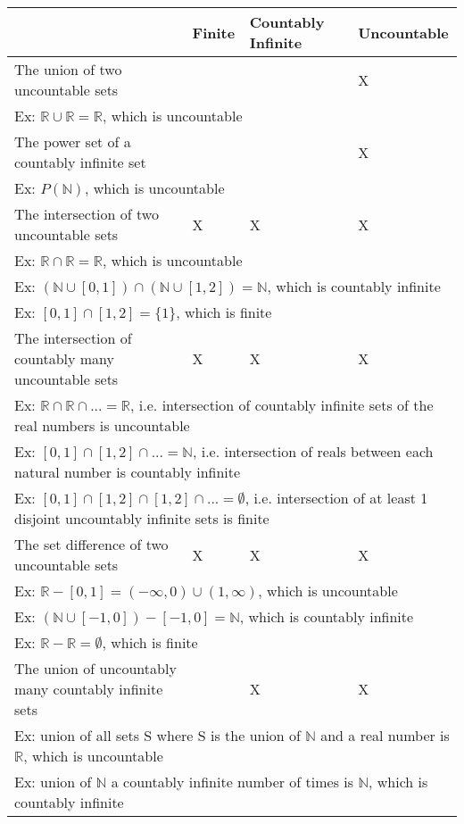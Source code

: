 \documentclass[11pt]{article}
\begin{document}
\noindent
\begin{tabular}{|l|l|l|l|}
\hline
& Finite & Countably Infinite & Uncountable\\
\hline
The union of two uncountable sets &  &  & X\\
\hline
\multicolumn{4}{|l|}{Ex: $\mathbb{R}\cup\mathbb{R}=\mathbb{R}$, which is uncountable}\\
\hline
The power set of a countably infinite set & & & X\\
\hline
\multicolumn{4}{|l|}{Ex: $P(\mathbb{N})$, which is uncountable}\\
\hline
The intersection of two uncountable sets & X & X & X\\
\hline
\multicolumn{4}{|l|}{Ex: $\mathbb{R}\cap\mathbb{R}=\mathbb{R}$, which is uncountable}\\
\multicolumn{4}{|l|}{Ex: $(\mathbb{N}\cup[0,1])\cap(\mathbb{N}\cup[1,2])=\mathbb{N}$, which is countably infinite}\\
\multicolumn{4}{|l|}{Ex: $[0,1]\cap[1,2]=\{1\}$, which is finite}\\
\hline
The intersection of countably many uncountable sets & X & X & X\\
\hline
\multicolumn{4}{|l|}{Ex: $\mathbb{R}\cap\mathbb{R}\cap...=\mathbb{R}$, i.e. intersection of countably infinite sets of the real numbers is uncountable}\\
\multicolumn{4}{|l|}{Ex: $[0,1]\cap[1,2]\cap...=\mathbb{N}$, i.e. intersection of reals between each natural number is countably infinite}\\
\multicolumn{4}{|l|}{Ex: $[0,1]\cap[1,2]\cap[1,2]\cap...=\emptyset$, i.e. intersection of at least 1 disjoint uncountably infinite sets is finite}\\
\hline
The set difference of two uncountable sets & X & X & X\\
\hline
\multicolumn{4}{|l|}{Ex: $\mathbb{R}-[0,1]=(-\infty,0)\cup(1,\infty)$, which is uncountable}\\
\multicolumn{4}{|l|}{Ex: $(\mathbb{N}\cup[-1,0])-[-1,0]=\mathbb{N}$, which is countably infinite}\\
\multicolumn{4}{|l|}{Ex: $\mathbb{R}-\mathbb{R}=\emptyset$, which is finite}\\
\hline
The union of uncountably many countably infinite sets& & X & X\\
\hline
\multicolumn{4}{|l|}{Ex: union of all sets S where S is the union of $\mathbb{N}$ and a real number is $\mathbb{R}$, which is uncountable}\\
\multicolumn{4}{|l|}{Ex: union of $\mathbb{N}$ a countably infinite number of times is $\mathbb{N}$, which is countably infinite}\\
\hline
\end{tabular}

\bigskip
\end{document}
